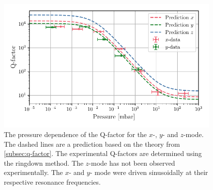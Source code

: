 \begin{figure}
    \centering
    \includegraphics{figures/data/q_factor_pressure_dependence.pdf}
    \caption{The pressure dependence of the Q-factor for the $x$-, $y$- and $z$-mode. The dashed lines are a prediction based on the theory from \autoref{subsec:q-factor}. The experimental Q-factors are determined using the ringdown method. The $z$-mode has not been observed experimentally. The $x$- and $y$- mode were driven sinusoidally at their respective resonance frequencies.}
    \label{fig:q-factor-pressure-dependence}
\end{figure}
